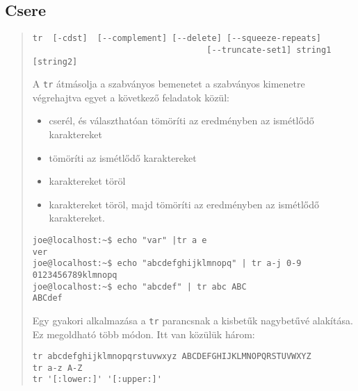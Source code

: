 \subsection{Csere}
\noindent {}
\begin{quotation}
\begin{verbatim}
tr  [-cdst]  [--complement] [--delete] [--squeeze-repeats]  
                                   [--truncate-set1] string1 [string2]
\end{verbatim}\bigskip

    A  \texttt{tr} átmásolja a szabványos bemenetet a szabványos kimenetre  végrehajtva
       egyet a következő feladatok közül:
  \begin{itemize}
   \item  cserél, és választhatóan tömöríti az eredményben az ismétlődő
    karaktereket
   \item   tömöríti az ismétlődő karaktereket
    \item  karaktereket töröl
    \item  karaktereket töröl, majd tömöríti az eredményben az  ismétlődő
              karaktereket.
  \end{itemize}            



\begin{lstlisting}
joe@localhost:~$ echo "var" |tr a e
ver
joe@localhost:~$ echo "abcdefghijklmnopq" | tr a-j 0-9
0123456789klmnopq
joe@localhost:~$ echo "abcdef" | tr abc ABC
ABCdef
\end{lstlisting}

Egy   gyakori   alkalmazása  a  \verb.tr.  parancsnak  a  kisbetűk  nagybetűvé
       alakítása. Ez megoldható több módon. Itt van közülük három:
\begin{lstlisting}
tr abcdefghijklmnopqrstuvwxyz ABCDEFGHIJKLMNOPQRSTUVWXYZ
tr a-z A-Z
tr '[:lower:]' '[:upper:]'   
\end{lstlisting}

\end{quotation}
\bigskip

